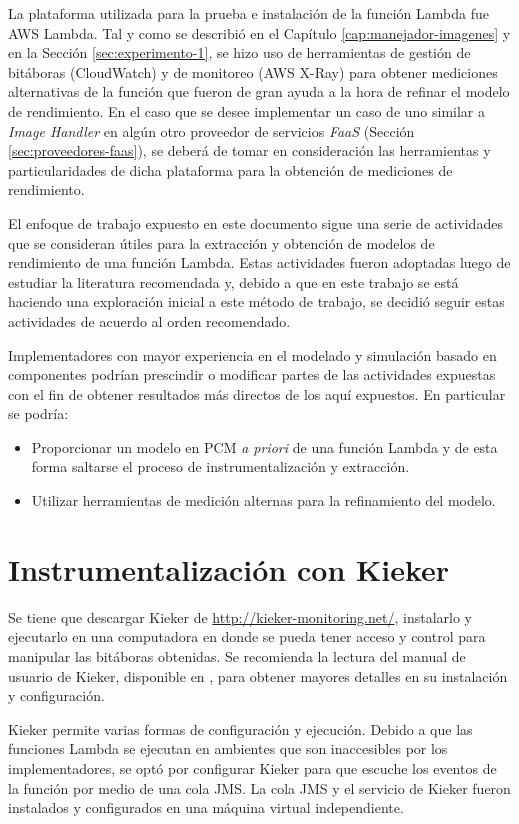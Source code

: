 La plataforma utilizada para la prueba e instalación de la función Lambda fue AWS Lambda. Tal y como se describió en el Capítulo \ref{cap:manejador-imagenes} y en la Sección \ref{sec:experimento-1}, se hizo uso de herramientas de gestión de bitáboras (CloudWatch) y de monitoreo (AWS X-Ray) para obtener mediciones alternativas de la función que fueron de gran ayuda a la hora de refinar el modelo de rendimiento. En el caso que se desee implementar un caso de uno similar a \emph{Image Handler} en algún otro proveedor de servicios \emph{FaaS} (Sección \ref{sec:proveedores-faas}), se deberá de tomar en consideración las herramientas y particularidades de dicha plataforma para la obtención de mediciones de rendimiento.

El enfoque de trabajo expuesto en este documento sigue una serie de actividades que se consideran útiles para la extracción y obtención de modelos de rendimiento de una función Lambda. Estas actividades fueron adoptadas luego de estudiar la literatura recomendada y, debido a que en este trabajo se está haciendo una exploración inicial a este método de trabajo, se decidió seguir estas actividades de acuerdo al orden recomendado.

Implementadores con mayor experiencia en el modelado y simulación basado en componentes podrían prescindir o modificar partes de las actividades expuestas con el fin de obtener resultados más directos de los aquí expuestos. En particular se podría:
\begin{itemize}
    \item Proporcionar un modelo en PCM \emph{a priori} de una función Lambda y de esta forma saltarse el proceso de instrumentalización y extracción.
    \item Utilizar herramientas de medición alternas para la refinamiento del modelo.
\end{itemize}

\section{Instrumentalización con Kieker}
Se tiene que descargar Kieker de \url{http://kieker-monitoring.net/}, instalarlo y ejecutarlo en una computadora en donde se pueda tener acceso y control para manipular las bitáboras obtenidas. Se recomienda la lectura del manual de usuario de Kieker, disponible en \cite{kieker-user-guide}, para obtener mayores detalles en su instalación y configuración.

Kieker permite varias formas de configuración y ejecución. Debido a que las funciones Lambda se ejecutan en ambientes que son inaccesibles por los implementadores, se optó por configurar Kieker para que escuche los eventos de la función por medio de una cola JMS. La cola JMS y el servicio de Kieker fueron instalados y configurados en una máquina virtual independiente.

